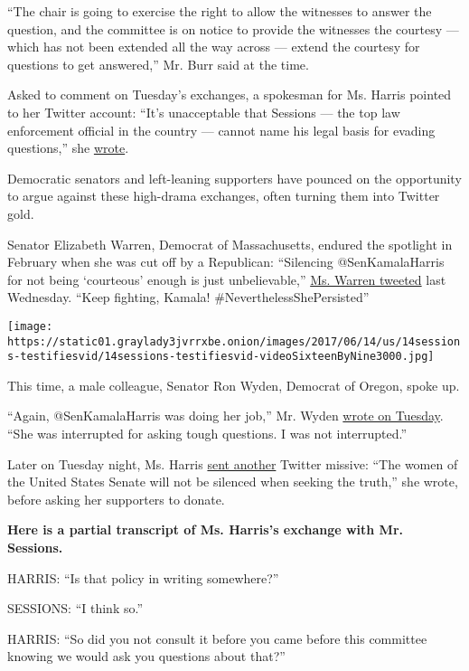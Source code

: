 ``The chair is going to exercise the right to allow the witnesses to
answer the question, and the committee is on notice to provide the
witnesses the courtesy --- which has not been extended all the way
across --- extend the courtesy for questions to get answered,'' Mr. Burr
said at the time.

Asked to comment on Tuesday's exchanges, a spokesman for Ms. Harris
pointed to her Twitter account: ``It's unacceptable that Sessions ---
the top law enforcement official in the country --- cannot name his
legal basis for evading questions,'' she
\href{https://twitter.com/SenKamalaHarris/status/874737698233344001}{wrote}.

Democratic senators and left-leaning supporters have pounced on the
opportunity to argue against these high-drama exchanges, often turning
them into Twitter gold.

Senator Elizabeth Warren, Democrat of Massachusetts, endured the
spotlight in February when she was cut off by a Republican: ``Silencing
@SenKamalaHarris for not being `courteous' enough is just
unbelievable,''
\href{https://twitter.com/SenWarren/status/872514688390713345}{Ms.
Warren tweeted} last Wednesday. ``Keep fighting, Kamala!
\#NeverthelessShePersisted''

\texttt{[image: https://static01.graylady3jvrrxbe.onion/images/2017/06/14/us/14sessions-testifiesvid/14sessions-testifiesvid-videoSixteenByNine3000.jpg]}

This time, a male colleague, Senator Ron Wyden, Democrat of Oregon,
spoke up.

``Again, @SenKamalaHarris was doing her job,'' Mr. Wyden
\href{https://twitter.com/RonWyden/status/874737345509163009}{wrote on
Tuesday}. ``She was interrupted for asking tough questions. I was not
interrupted.''

Later on Tuesday night, Ms. Harris
\href{https://twitter.com/KamalaHarris/status/874769055340793858}{sent
another} Twitter missive: ``The women of the United States Senate will
not be silenced when seeking the truth,'' she wrote, before asking her
supporters to donate.

\textbf{Here is a partial transcript of Ms. Harris's exchange with Mr.
Sessions.}

HARRIS: ``Is that policy in writing somewhere?''

SESSIONS: ``I think so.''

HARRIS: ``So did you not consult it before you came before this
committee knowing we would ask you questions about that?''

